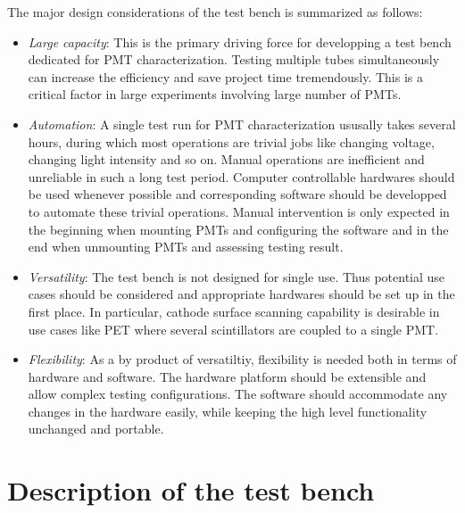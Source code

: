 \documentclass[5p, times]{elsarticle}
\begin{document}
The major design considerations of the test bench is summarized as follows:
\begin{itemize}
 \item \textit{Large capacity}: This is the primary driving force for developping a test bench dedicated for PMT characterization.
 Testing multiple tubes simultaneously can increase the efficiency and save project time tremendously.
 This is a critical factor in large experiments involving large number of PMTs.
 \item \textit{Automation}: A single test run for PMT characterization ususally takes several hours, during which most operations are trivial jobs like changing voltage, changing light intensity and so on.
 Manual operations are inefficient and unreliable in such a long test period.
 Computer controllable hardwares should be used whenever possible and corresponding software should be developped to automate these trivial operations.
 Manual intervention is only expected in the beginning when mounting PMTs and configuring the software and in the end when unmounting PMTs and assessing testing result. 
 \item \textit{Versatility}: The test bench is not designed for single use.
 T\-h\-u\-s potential use cases should be considered and appropriate hardwares should be set up in the first place.
 In particular, cathode surface scanning capability is desirable in use cases like PET where several scintillators are coupled to a single PMT. 
 \item \textit{Flexibility}: As a by product of versatiltiy, flexibility is needed both in terms of hardware and software.
 The hardware platform should be extensible and allow complex testing configurations.
 The software should accommodate any changes in the hardware easily, while keeping the high level functionality unchanged and portable. 
\end{itemize}


\section{Description of the test bench}
\label{sec:description}
\end{document}
